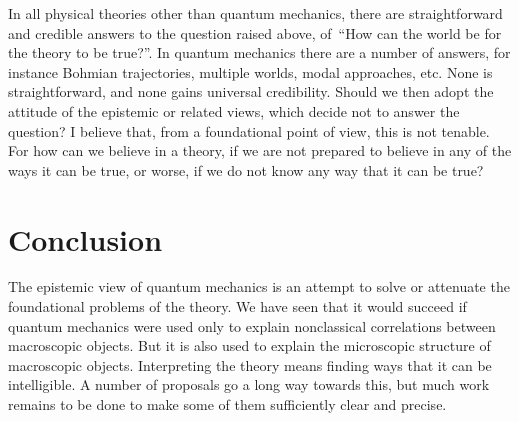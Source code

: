 \documentclass[12pt]{article}
\begin{document}
In all physical theories other than quantum mechanics,
there are straightforward and credible answers to the
question raised above, of \,``How can the world be for the
theory to be true?''.  In quantum mechanics there
are a number of answers, for instance Bohmian
trajectories, multiple worlds, modal approaches, etc.
None is straightforward, and none gains universal
credibility.  Should we then adopt the attitude
of the epistemic or related views, which decide
not to answer the question?  I believe that, from
a foundational point of view, this is not tenable.
For how can we believe in a theory, if we are not
prepared to believe in any of the ways it can be
true, or worse, if we do not know any way that it can
be true?
%
\section{Conclusion}
%
The epistemic view of quantum mechanics is an
attempt to solve or attenuate the foundational
problems of the theory.  We have seen that it would
succeed if quantum mechanics were used only to explain
nonclassical correlations between macroscopic
objects.  But it is also used to explain the
microscopic structure of macroscopic objects.
Interpreting the theory means finding ways that it
can be intelligible.  A number of proposals go a long
way towards this, but much work remains to be done to make
some of them sufficiently clear and precise.
%
\end{document}
